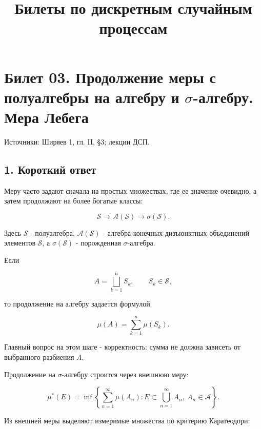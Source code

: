 \documentclass[
  11pt,
  a4paper,
]{article}
\title{Билеты по дискретным случайным процессам}
\author{}
\date{}
\begin{document}
\maketitle

\section{\texorpdfstring{Билет 03. Продолжение меры с полуалгебры на
алгебру и \(\sigma\)-алгебру. Мера
Лебега}{Билет 03. Продолжение меры с полуалгебры на алгебру и \textbackslash sigma-алгебру. Мера Лебега}}\label{ux431ux438ux43bux435ux442-03.-ux43fux440ux43eux434ux43eux43bux436ux435ux43dux438ux435-ux43cux435ux440ux44b-ux441-ux43fux43eux43bux443ux430ux43bux433ux435ux431ux440ux44b-ux43dux430-ux430ux43bux433ux435ux431ux440ux443-ux438-sigma-ux430ux43bux433ux435ux431ux440ux443.-ux43cux435ux440ux430-ux43bux435ux431ux435ux433ux430}

Источники: Ширяев 1, гл. II, §3; лекции ДСП.

\subsection{1. Короткий
ответ}\label{ux43aux43eux440ux43eux442ux43aux438ux439-ux43eux442ux432ux435ux442}

Меру часто задают сначала на простых множествах, где ее значение
очевидно, а затем продолжают на более богатые классы:

\[
\mathcal S\longrightarrow\mathcal A(\mathcal S)\longrightarrow\sigma(\mathcal S).
\]

Здесь \(\mathcal S\) - полуалгебра, \(\mathcal A(\mathcal S)\) - алгебра
конечных дизъюнктных объединений элементов \(\mathcal S\), а
\(\sigma(\mathcal S)\) - порожденная \(\sigma\)-алгебра.

Если

\[
A=\bigsqcup_{k=1}^n S_k,\qquad S_k\in\mathcal S,
\]

то продолжение на алгебру задается формулой

\[
\mu(A)=\sum_{k=1}^n\mu(S_k).
\]

Главный вопрос на этом шаге - корректность: сумма не должна зависеть от
выбранного разбиения \(A\).

Продолжение на \(\sigma\)-алгебру строится через внешнюю меру:

\[
\mu^*(E)=
\inf\left\{
\sum_{n=1}^{\infty}\mu(A_n):
E\subset\bigcup_{n=1}^{\infty}A_n,\ A_n\in\mathcal A
\right\}.
\]

Из внешней меры выделяют измеримые множества по критерию Каратеодори:
\end{document}
